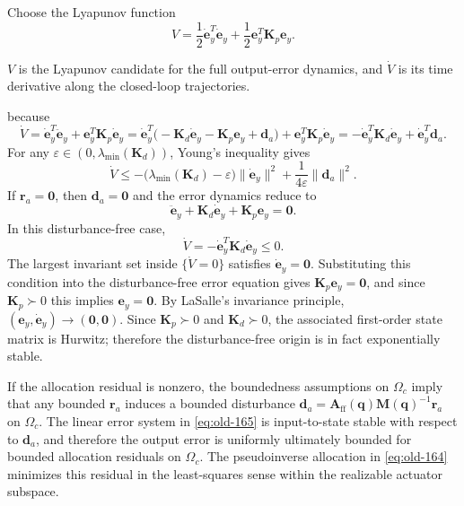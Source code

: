 \documentclass[12pt,a4paper]{report}
\newcommand{\newsymbols}[1]{\par\noindent{}#1\par\vspace{0.35em}}
\begin{document}
Choose the Lyapunov function
\begin{equation}
V =
\frac{1}{2} \dot{\mathbf{e}}_y^T \dot{\mathbf{e}}_y +
\frac{1}{2} \mathbf{e}_y^T \mathbf{K}_p \mathbf{e}_y.
\label{eq:old-166}
\end{equation}
\newsymbols{$V$ is the Lyapunov candidate for the full output-error dynamics, and $\dot{V}$ is its time derivative along the closed-loop trajectories.}
because
\begin{equation}
\dot{V}
= \dot{\mathbf{e}}_y^T \ddot{\mathbf{e}}_y + \mathbf{e}_y^T \mathbf{K}_p \dot{\mathbf{e}}_y
= \dot{\mathbf{e}}_y^T\bigl(-\mathbf{K}_d\dot{\mathbf{e}}_y - \mathbf{K}_p\mathbf{e}_y + \mathbf{d}_a\bigr) + \mathbf{e}_y^T \mathbf{K}_p \dot{\mathbf{e}}_y
= -\dot{\mathbf{e}}_y^T \mathbf{K}_d \dot{\mathbf{e}}_y + \dot{\mathbf{e}}_y^T \mathbf{d}_a.
\end{equation}
For any $\varepsilon \in (0,\lambda_{\min}(\mathbf{K}_d))$, Young's inequality gives
\begin{equation}
\dot{V}
\le
-\bigl(\lambda_{\min}(\mathbf{K}_d) - \varepsilon\bigr)\|\dot{\mathbf{e}}_y\|^2
+ \frac{1}{4\varepsilon}\|\mathbf{d}_a\|^2.
\end{equation}
If $\mathbf{r}_a=\mathbf{0}$, then $\mathbf{d}_a=\mathbf{0}$ and the error dynamics reduce to
\begin{equation}
\ddot{\mathbf{e}}_y+\mathbf{K}_d\dot{\mathbf{e}}_y+\mathbf{K}_p\mathbf{e}_y=\mathbf{0}.
\end{equation}
In this disturbance-free case,
\begin{equation}
\dot{V}=-\dot{\mathbf{e}}_y^T\mathbf{K}_d\dot{\mathbf{e}}_y\le 0.
\end{equation}
The largest invariant set inside $\{\dot{V}=0\}$ satisfies $\dot{\mathbf{e}}_y=\mathbf{0}$. Substituting this condition into the disturbance-free error equation gives $\mathbf{K}_p\mathbf{e}_y=\mathbf{0}$, and since $\mathbf{K}_p\succ0$ this implies $\mathbf{e}_y=\mathbf{0}$. By LaSalle's invariance principle, $(\mathbf{e}_y,\dot{\mathbf{e}}_y)\to(\mathbf{0},\mathbf{0})$. Since $\mathbf{K}_p \succ 0$ and $\mathbf{K}_d \succ 0$, the associated first-order state matrix is Hurwitz; therefore the disturbance-free origin is in fact exponentially stable.

If the allocation residual is nonzero, the boundedness assumptions on $\Omega_c$ imply that any bounded $\mathbf{r}_a$ induces a bounded disturbance $\mathbf{d}_a=\mathbf{A}_{\mathrm{ff}}(\mathbf{q})\mathbf{M}(\mathbf{q})^{-1}\mathbf{r}_a$ on $\Omega_c$. The linear error system in \eqref{eq:old-165} is input-to-state stable with respect to $\mathbf{d}_a$, and therefore the output error is uniformly ultimately bounded for bounded allocation residuals on $\Omega_c$. The pseudoinverse allocation in \eqref{eq:old-164} minimizes this residual in the least-squares sense within the realizable actuator subspace.
\end{document}
